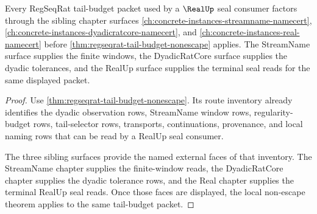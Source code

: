 \begin{theorem}
\label{thm:regseqrat-tail-budget-sibling-route}
Every RegSeqRat tail-budget packet used by a $\RealUp$ seal consumer factors through the sibling chapter surfaces \autoref{ch:concrete-instances-streamname-namecert}, \autoref{ch:concrete-instances-dyadicratcore-namecert}, and \autoref{ch:concrete-instances-real-namecert} before \autoref{thm:regseqrat-tail-budget-nonescape} applies. The StreamName surface supplies the finite windows, the DyadicRatCore surface supplies the dyadic tolerances, and the RealUp surface supplies the terminal seal reads for the same displayed packet.
\end{theorem}
\begin{proof}
Use \autoref{thm:regseqrat-tail-budget-nonescape}. Its route inventory already identifies the dyadic observation rows, StreamName window rows, regularity-budget rows, tail-selector rows, transports, continuations, provenance, and local naming rows that can be read by a RealUp seal consumer.

The three sibling surfaces provide the named external faces of that inventory. The StreamName chapter supplies the finite-window reads, the DyadicRatCore chapter supplies the dyadic tolerance rows, and the Real chapter supplies the terminal RealUp seal reads. Once those faces are displayed, the local non-escape theorem applies to the same tail-budget packet.
\end{proof}
